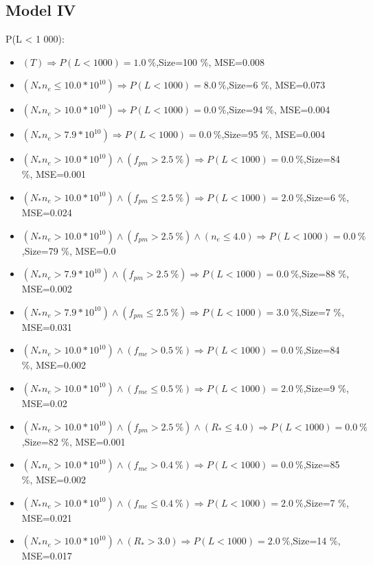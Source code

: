 \documentclass[numbered]{CSL}
\begin{document}
\subsection{Model IV}
P(L < 1 000):
\begin{itemize}
\item $(T) \Rightarrow P(L < 1 000) = 1.0~\%$,\hfill Size=100 \%, MSE=0.008
\item $(N_* n_e \leq 10.0 * 10^{10}) \Rightarrow P(L < 1 000) = 8.0~\%$,\hfill Size=6 \%, MSE=0.073
\item $(N_* n_e > 10.0 * 10^{10}) \Rightarrow P(L < 1 000) = 0.0~\%$,\hfill Size=94 \%, MSE=0.004
\item $(N_* n_e > 7.9 * 10^{10}) \Rightarrow P(L < 1 000) = 0.0~\%$,\hfill Size=95 \%, MSE=0.004
\item $(N_* n_e > 10.0 * 10^{10}) \land (f_{pm} > 2.5~\%) \Rightarrow P(L < 1 000) = 0.0~\%$,\hfill Size=84 \%, MSE=0.001
\item $(N_* n_e > 10.0 * 10^{10}) \land (f_{pm} \leq 2.5~\%) \Rightarrow P(L < 1 000) = 2.0~\%$,\hfill Size=6 \%, MSE=0.024
\item $(N_* n_e > 10.0 * 10^{10}) \land (f_{pm} > 2.5~\%) \land (n_e \leq 4.0) \Rightarrow P(L < 1 000) = 0.0~\%$,\hfill Size=79 \%, MSE=0.0
\item $(N_* n_e > 7.9 * 10^{10}) \land (f_{pm} > 2.5~\%) \Rightarrow P(L < 1 000) = 0.0~\%$,\hfill Size=88 \%, MSE=0.002
\item $(N_* n_e > 7.9 * 10^{10}) \land (f_{pm} \leq 2.5~\%) \Rightarrow P(L < 1 000) = 3.0~\%$,\hfill Size=7 \%, MSE=0.031
\item $(N_* n_e > 10.0 * 10^{10}) \land (f_{me} > 0.5~\%) \Rightarrow P(L < 1 000) = 0.0~\%$,\hfill Size=84 \%, MSE=0.002
\item $(N_* n_e > 10.0 * 10^{10}) \land (f_{me} \leq 0.5~\%) \Rightarrow P(L < 1 000) = 2.0~\%$,\hfill Size=9 \%, MSE=0.02
\item $(N_* n_e > 10.0 * 10^{10}) \land (f_{pm} > 2.5~\%) \land (R_* \leq 4.0) \Rightarrow P(L < 1 000) = 0.0~\%$,\hfill Size=82 \%, MSE=0.001
\item $(N_* n_e > 10.0 * 10^{10}) \land (f_{me} > 0.4~\%) \Rightarrow P(L < 1 000) = 0.0~\%$,\hfill Size=85 \%, MSE=0.002
\item $(N_* n_e > 10.0 * 10^{10}) \land (f_{me} \leq 0.4~\%) \Rightarrow P(L < 1 000) = 2.0~\%$,\hfill Size=7 \%, MSE=0.021
\item $(N_* n_e > 10.0 * 10^{10}) \land (R_* > 3.0) \Rightarrow P(L < 1 000) = 2.0~\%$,\hfill Size=14 \%, MSE=0.017

\end{itemize}
\end{document}
